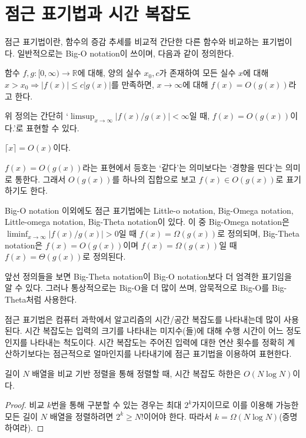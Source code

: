 \section{점근 표기법과 시간 복잡도}
점근 표기법이란, 함수의 증감 추세를 비교적 간단한 다른 함수와 비교하는 표기법이다. 일반적으로는 Big-O notation이 쓰이며, 다음과 같이 정의한다.
\begin{definition}
    함수 $f, g:[0, \infty)\to \mathbb{R}$에 대해, 양의 실수 $x_0, c$가 존재하여 모든 실수 $x$에 대해 $x>x_0\Rightarrow |f(x)|\leq c|g(x)|$를 만족하면, $x\to\infty$에 대해 $f(x)=O(g(x))$라고 한다.
\end{definition}
위 정의는 간단히 `$\limsup_{x\to\infty}|f(x)/g(x)|<\infty$일 때, $f(x)=O(g(x))$이다.'로 표현할 수 있다.
\begin{example}
    $\lceil x\rceil=O(x)$이다.
\end{example}
\begin{remark}
    $f(x)=O(g(x))$라는 표현에서 등호는 `같다'는 의미보다는 `경향을 띤다'는 의미로 통한다. 그래서 $O(g(x))$를 하나의 집합으로 보고 $f(x)\in O(g(x))$로 표기하기도 한다.
\end{remark}
Big-O notation 이외에도 점근 표기법에는 Little-o notation, Big-Omega notation, Little-omega notation, Big-Theta notation이 있다. 이 중 Big-Omega notation은 $\liminf_{x\to\infty}|f(x)/g(x)|>0$일 때 $f(x)=\Omega(g(x))$로 정의되며, Big-Theta notation은 $f(x)=O(g(x))$이며 $f(x)=\Omega(g(x))$일 때 $f(x)=\Theta(g(x))$로 정의된다. 
\begin{remark}
    앞선 정의들을 보면 Big-Theta notation이 Big-O notation보다 더 엄격한 표기임을 알 수 있다. 그러나 통상적으로는 Big-O을 더 많이 쓰며, 암묵적으로 Big-O를 Big-Theta처럼 사용한다.
\end{remark}
점근 표기법은 컴퓨터 과학에서 알고리즘의 시간/공간 복잡도를 나타내는데 많이 사용된다. 시간 복잡도는 입력의 크기를 나타내는 미지수(들)에 대해 수행 시간이 어느 정도인지를 나타내는 척도이다. 시간 복잡도는 주어진 입력에 대한 연산 횟수를 정확히 계산하기보다는 점근적으로 얼마인지를 나타내기에 점근 표기법을 이용하여 표현한다.
\begin{example}
    길이 $N$ 배열을 비교 기반 정렬을 통해 정렬할 때, 시간 복잡도 하한은 $O(N\log N)$이다.
\end{example}
\begin{proof}
    비교 $k$번을 통해 구분할 수 있는 경우는 최대 $2^k$가지이므로 이를 이용해 가능한 모든 길이 $N$ 배열을 정렬하려면 $2^k\geq N!$이어야 한다. 따라서 $k=\Omega(N \log N)$(증명하여라).
\end{proof}
